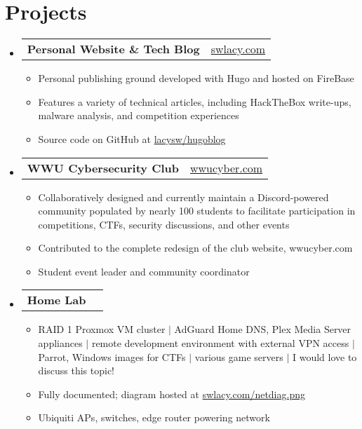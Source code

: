 \documentclass[10pt]{article}
\makeatletter
\newcommand{\resumeItem}[1]{
  \item\small{
    {#1 \vspace{-2pt}}
  }
}
\newcommand{\resumeProjectHeading}[2]{
    \item
    \begin{tabular*}{0.97\textwidth}{l@{\extracolsep{\fill}}r}
      \small#1 & #2 \\
    \end{tabular*}\vspace{-7pt}
}
\newcommand{\resumeSubHeadingListStart}{\begin{itemize}[leftmargin=0.15in, label={}]}
\newcommand{\resumeSubHeadingListEnd}{\end{itemize}}
\newcommand{\resumeItemListStart}{\begin{itemize}}
\newcommand{\resumeItemListEnd}{\end{itemize}\vspace{-5pt}}
\makeatother
\begin{document}
\section{Projects}
    \resumeSubHeadingListStart
      \resumeProjectHeading
          {\textbf{Personal Website \& Tech Blog}}{\href{https://swlacy.com}{swlacy.com}}
          \resumeItemListStart
            \resumeItem{Personal publishing ground developed with Hugo and hosted on FireBase}
            \resumeItem{Features a variety of technical articles, including HackTheBox write-ups, malware analysis, and competition experiences}
            \resumeItem{Source code on GitHub at \href{https://github.com/lacysw/hugoblog}{lacysw/hugoblog}}
          \resumeItemListEnd
      \resumeProjectHeading
          {\textbf{WWU Cybersecurity Club}}{\href{https://wwucyber.com}{wwucyber.com}}
          \resumeItemListStart
            \resumeItem{Collaboratively designed and currently maintain a Discord-powered community populated by nearly 100 students to facilitate participation in competitions, CTFs, security discussions, and other events}
            \resumeItem{Contributed to the complete redesign of the club website, wwucyber.com}
            \resumeItem{Student event leader and community coordinator}
          \resumeItemListEnd
      \resumeProjectHeading
          {\textbf{Home Lab}}{}
          \resumeItemListStart
            \resumeItem{RAID 1 Proxmox VM cluster $|$ AdGuard Home DNS, Plex Media Server appliances $|$ remote development environment with external VPN access $|$ Parrot, Windows images for CTFs $|$ various game servers $|$ I would love to discuss this topic!}
            \resumeItem{Fully documented; diagram hosted at \href{https://swlacy.com/netdiag.png}{swlacy.com/netdiag.png}}
            \resumeItem{Ubiquiti APs, switches, edge router powering network}
          \resumeItemListEnd
    \resumeSubHeadingListEnd
\end{document}
